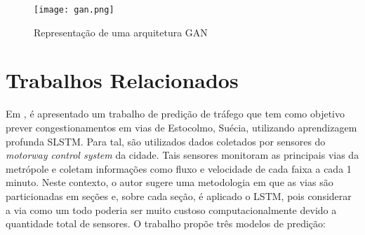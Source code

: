 \begin{figure}[htb]
    \centering
    \texttt{[image: gan.png]}
    \label{figure:eixo}
    \caption[Representação de uma arquitetura GAN]{Representação de uma arquitetura GAN\footnotemark}
\end{figure}







\section{Trabalhos Relacionados}

Em \cite{Zainab_2018}, é apresentado um trabalho de predição de tráfego que tem como objetivo prever congestionamentos em vias de Estocolmo, Suécia, utilizando aprendizagem profunda \acrfull{SLSTM}. Para tal, são utilizados dados coletados por sensores do \textit{motorway control system} da cidade. Tais sensores monitoram as principais vias da metrópole e coletam informações como fluxo e velocidade de cada faixa a cada 1 minuto. Neste contexto, o autor sugere uma metodologia em que as vias são particionadas em seções e, sobre cada seção, é aplicado o \acrshort{LSTM}, pois considerar a via como um todo poderia ser muito custoso computacionalmente devido a quantidade total de sensores. O trabalho propõe três modelos de predição:

